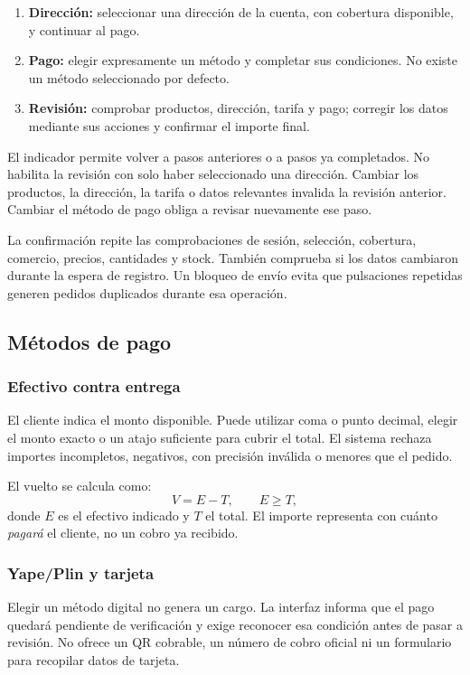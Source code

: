 \documentclass[12pt,letterpaper]{article}
\begin{document}
\begin{enumerate}
  \item \textbf{Dirección:} seleccionar una dirección de la cuenta, con cobertura disponible, y continuar al pago.
  \item \textbf{Pago:} elegir expresamente un método y completar sus condiciones. No existe un método seleccionado por defecto.
  \item \textbf{Revisión:} comprobar productos, dirección, tarifa y pago; corregir los datos mediante sus acciones y confirmar el importe final.
\end{enumerate}

El indicador permite volver a pasos anteriores o a pasos ya completados. No habilita la revisión con solo haber seleccionado una dirección. Cambiar los productos, la dirección, la tarifa o datos relevantes invalida la revisión anterior. Cambiar el método de pago obliga a revisar nuevamente ese paso.

La confirmación repite las comprobaciones de sesión, selección, cobertura, comercio, precios, cantidades y stock. También comprueba si los datos cambiaron durante la espera de registro. Un bloqueo de envío evita que pulsaciones repetidas generen pedidos duplicados durante esa operación.

\subsection{Métodos de pago}

\subsubsection{Efectivo contra entrega}

El cliente indica el monto disponible. Puede utilizar coma o punto decimal, elegir el monto exacto o un atajo suficiente para cubrir el total. El sistema rechaza importes incompletos, negativos, con precisión inválida o menores que el pedido.

El vuelto se calcula como:
\[
  V = E - T, \qquad E \geq T,
\]
donde $E$ es el efectivo indicado y $T$ el total. El importe representa con cuánto \emph{pagará} el cliente, no un cobro ya recibido.

\subsubsection{Yape/Plin y tarjeta}

Elegir un método digital no genera un cargo. La interfaz informa que el pago quedará pendiente de verificación y exige reconocer esa condición antes de pasar a revisión. No ofrece un QR cobrable, un número de cobro oficial ni un formulario para recopilar datos de tarjeta.
\end{document}
